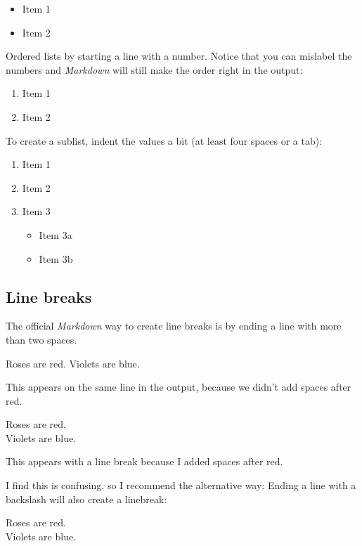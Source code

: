 \documentclass[a4paper,nobind]{templates/ociamthesis}
\providecommand{\tightlist}{%
  \setlength{\itemsep}{0pt}\setlength{\parskip}{0pt}}
\begin{document}
\begin{itemize}
\tightlist
\item
  Item 1
\item
  Item 2
\end{itemize}

Ordered lists by starting a line with a number. Notice that you can
mislabel the numbers and \emph{Markdown} will still make the order right
in the output:

\begin{enumerate}
\def\labelenumi{\arabic{enumi}.}
\tightlist
\item
  Item 1
\item
  Item 2
\end{enumerate}

To create a sublist, indent the values a bit (at least four spaces or a
tab):

\begin{enumerate}
\def\labelenumi{\arabic{enumi}.}
\tightlist
\item
  Item 1
\item
  Item 2
\item
  Item 3

  \begin{itemize}
  \tightlist
  \item
    Item 3a
  \item
    Item 3b
  \end{itemize}
\end{enumerate}

\subsection{Line breaks}\label{line-breaks}

The official \emph{Markdown} way to create line breaks is by ending a
line with more than two spaces.

Roses are red. Violets are blue.

This appears on the same line in the output, because we didn't add
spaces after red.

Roses are red.\\
Violets are blue.

This appears with a line break because I added spaces after red.

I find this is confusing, so I recommend the alternative way: Ending a
line with a backslash will also create a linebreak:

Roses are red.\\
Violets are blue.
\end{document}
